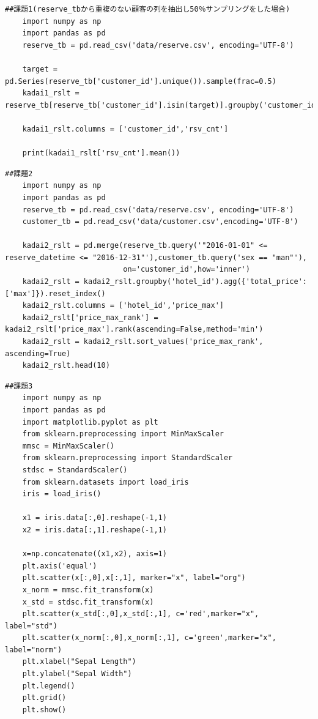 \documentclass[12pt]{jarticle}
\begin{document}
\begin{lstlisting}[style = py,caption=課題1(2)]
    ##課題1(reserve_tbから重複のない顧客の列を抽出し50％サンプリングをした場合)
    import numpy as np
    import pandas as pd
    reserve_tb = pd.read_csv('data/reserve.csv', encoding='UTF-8')
    
    target = pd.Series(reserve_tb['customer_id'].unique()).sample(frac=0.5)
    kadai1_rslt = reserve_tb[reserve_tb['customer_id'].isin(target)].groupby('customer_id').size().reset_index()
    
    kadai1_rslt.columns = ['customer_id','rsv_cnt']
    
    print(kadai1_rslt['rsv_cnt'].mean())
\end{lstlisting}

\begin{lstlisting}[style = py,caption=課題2]
    ##課題2
    import numpy as np
    import pandas as pd
    reserve_tb = pd.read_csv('data/reserve.csv', encoding='UTF-8')
    customer_tb = pd.read_csv('data/customer.csv',encoding='UTF-8')
    
    kadai2_rslt = pd.merge(reserve_tb.query('"2016-01-01" <= reserve_datetime <= "2016-12-31"'),customer_tb.query('sex == "man"'),
                           on='customer_id',how='inner')
    kadai2_rslt = kadai2_rslt.groupby('hotel_id').agg({'total_price':['max']}).reset_index()
    kadai2_rslt.columns = ['hotel_id','price_max']
    kadai2_rslt['price_max_rank'] = kadai2_rslt['price_max'].rank(ascending=False,method='min')
    kadai2_rslt = kadai2_rslt.sort_values('price_max_rank', ascending=True)
    kadai2_rslt.head(10)
\end{lstlisting}

\begin{lstlisting}[style = py,caption=課題3]
    ##課題3
    import numpy as np
    import pandas as pd
    import matplotlib.pyplot as plt
    from sklearn.preprocessing import MinMaxScaler
    mmsc = MinMaxScaler()
    from sklearn.preprocessing import StandardScaler
    stdsc = StandardScaler()
    from sklearn.datasets import load_iris
    iris = load_iris()
    
    x1 = iris.data[:,0].reshape(-1,1)
    x2 = iris.data[:,1].reshape(-1,1)
    
    x=np.concatenate((x1,x2), axis=1)
    plt.axis('equal')
    plt.scatter(x[:,0],x[:,1], marker="x", label="org")
    x_norm = mmsc.fit_transform(x)
    x_std = stdsc.fit_transform(x)
    plt.scatter(x_std[:,0],x_std[:,1], c='red',marker="x", label="std")
    plt.scatter(x_norm[:,0],x_norm[:,1], c='green',marker="x", label="norm")
    plt.xlabel("Sepal Length")
    plt.ylabel("Sepal Width")
    plt.legend()
    plt.grid()
    plt.show()
\end{lstlisting}
\end{document}
